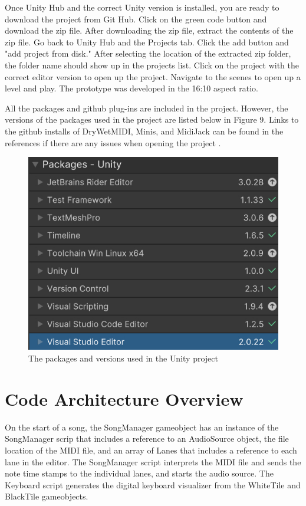 \documentclass[10pt,twocolumn]{article}
\begin{document}
Once Unity Hub and the correct Unity version is installed, you are ready to download the project from Git Hub. Click on the green code button and download the zip file. After downloading the zip file, extract the contents of the zip file. Go back to Unity Hub and the Projects tab. Click the add button and "add project from disk." After selecting the location of the extracted zip folder, the folder name should show up in the projects list. Click on the project with the correct editor version to open up the project. Navigate to the scenes to open up a level and play. The prototype was developed in the 16:10 aspect ratio. 

All the packages and github plug-ins are included in the project. However, the versions of the packages used in the project are listed below in Figure 9. Links to the github installs of DryWetMIDI, Minis, and MidiJack can be found in the references if there are any issues when opening the project \cite{drywetmidi}\cite{minis}\cite{midijack}.


\begin{figure}[h]
    \centering
    \includegraphics[width=.95\linewidth]{UnityPackages.png}
    \caption{
       The packages and versions used in the Unity project
    }
    \label{fig:first-page}
\end{figure}


\section{Code Architecture Overview}
On the start of a song, the SongManager gameobject has an instance of the SongManager scrip that includes a reference to an AudioSource object, the file location of the MIDI file, and an array of Lanes that includes a reference to each lane in the editor. The SongManager script interprets the MIDI file and sends the note time stamps to the individual lanes, and starts the audio source. The Keyboard script generates the digital keyboard visualizer from the WhiteTile and BlackTile gameobjects.
\end{document}

